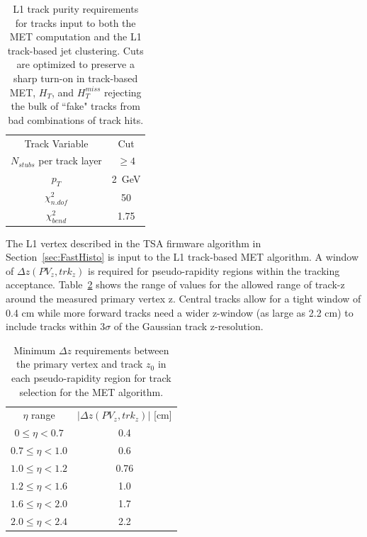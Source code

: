 \begin{table}[h]
\begin{tabular}{|c|c|}
Track Variable & Cut\\
$N_{stubs}$ per track layer&$\geq 4$ \\
$p_{T}$ & 2~GeV \\
$\chi^{2}_{n.dof}$ & 50 \\
$\chi^{2}_{bend}$  & 1.75 \\

\end{tabular}
\caption{ L1 track purity requirements for tracks input to both the MET computation and the L1 track-based jet clustering. Cuts are optimized to preserve a sharp turn-on in track-based MET, $H_{T}$, and $H^{miss}_{T}$ rejecting the bulk of ``fake" tracks from bad combinations of track hits.}
\label{tab:trkpurity}
\end{table}

The L1 vertex described in the TSA firmware algorithm in Section~\ref{sec:FastHisto} is input to the L1 track-based MET algorithm. A window of $\Delta z\left(PV_{z}, trk_{z}\right)$ is required for pseudo-rapidity regions within the tracking acceptance. Table~\ref{tab:zwindows} shows the range of values for the allowed range of track-z around the measured primary vertex z. Central tracks allow for a tight window of 0.4 cm while more forward tracks need a wider z-window (as large as 2.2 cm) to include tracks within $3\sigma$ of the Gaussian track z-resolution.
\begin{table}[h]
\begin{tabular}{|c|c|}
$\eta$ range & $\vert \Delta z\left(PV_{z}, trk_{z}\right) \vert$  [cm] \\
 $0\leq \eta < 0.7$ & 0.4\\
$0.7\leq \eta <1.0 $& 0.6\\
$1.0\leq \eta < 1.2 $ & 0.76\\
$1.2\leq \eta < 1.6$ & 1.0 \\
$1.6\leq \eta <  2.0 $& 1.7 \\
$2.0\leq  \eta < 2.4 $ & 2.2 \\
\end{tabular}
\caption{Minimum $\Delta z $ requirements between the primary vertex and track $z_{0}$ in each pseudo-rapidity region for track selection for the MET algorithm. }
\label{tab:zwindows}
\end{table}

